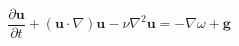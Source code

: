     \begin{center}
        \begin{equation*}
            \frac{\partial{\mathbf{u}}}{\partial{t}} +
            (\mathbf{u} \cdot \nabla)\mathbf{u} -
            \nu \nabla^2 \mathbf{u} = - \nabla \omega + \mathbf{g}
        \end{equation*}
    \end{center}
